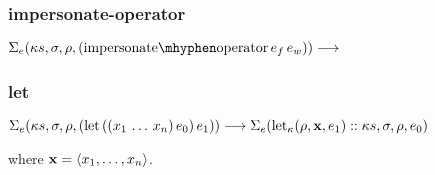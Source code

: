 \documentclass{sigplanconf}
\begin{document}









\subsubsection{impersonate-operator}

$\red{\sexp{\ks}{\sigma}{\rho}{\impe{e_f}{e_w}}}{}$

\subsubsection{let}

\noindent
$\Sigma_e(\kappa s,\sigma,\rho,(\mathrm{let}\,((x_1\,\dots\, x_n)\,e_0)\,e_1))\longrightarrow \Sigma_e(\mathrm{let}_\kappa(\rho,\mathbf{x},e_1)::\kappa s,\sigma,\rho,e_0)$

\noindent
where $\mathbf{x}=\langle x_1,\dots,x_n\rangle$.
\end{document}
